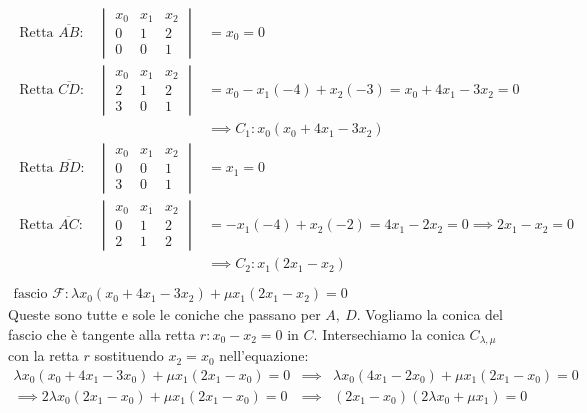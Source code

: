 \begin{solution}
		\begin{gather*}
			\begin{array}{lll}
			\text{Retta } \overline{AB} \colon & \begin{vmatrix}
					x_0 & x_1 & x_2 \\
					0 & 1 & 2 \\
					0 & 0 & 1
				\end{vmatrix} & = x_0=0\\
			\text{Retta } \overline{CD} \colon & \begin{vmatrix}
				x_0 & x_1 & x_2 \\
				2 & 1 & 2 \\
				3 & 0 & 1
			\end{vmatrix} & = x_0- x_1 (-4) + x_2(-3)=x_0 +4x_1-3x_2=0\\
			&& \implies C_1\colon x_0(x_0+4x_1-3x_2)\\
			\text{Retta } \overline{BD} \colon & \begin{vmatrix}
					x_0 & x_1 & x_2 \\
					0 & 0 & 1 \\
					3 & 0 & 1
				\end{vmatrix} & = x_1=0\\
				\text{Retta } \overline{AC} \colon & \begin{vmatrix}
					x_0 & x_1 & x_2 \\
					0 & 1 & 2 \\
					2 & 1 & 2
				\end{vmatrix} & = -x_1(-4) +x_2(-2)= 4x_1 -2x_2=0 \implies 2x_1-x_2=0\\
			&& \implies C_2 \colon x_1(2x_1-x_2) \\
			\end{array}\\
			\text{fascio } \mathcal{F}\colon \lambda x_0(x_0+4x_1-3x_2) +\mu x_1(2x_1-x_2)=0
		\end{gather*}
	Queste sono tutte e sole le coniche che passano per $A,\ D$. Vogliamo la conica del fascio che è tangente alla retta $r\colon x_0-x_2=0$ in $C$. Intersechiamo la conica $C_{\lambda,\mu}$ con la retta $r$ sostituendo $x_2=x_0$ nell'equazione:
		\begin{equation*}
			\begin{array}{lll}
				\lambda x_0(x_0+4x_1-3x_0)+\mu x_1(2x_1-x_0)=0 & \implies & \lambda x_0(4x_1-2x_0)+ \mu x_1(2x_1-x_0)=0\\
				\implies 2\lambda x_0(2x_1-x_0)+ \mu x_1(2x_1-x_0)=0 & \implies & (2x_1-x_0)(2\lambda x_0 +\mu x_1)=0
			\end{array}

\end{equation*}
\end{solution}
